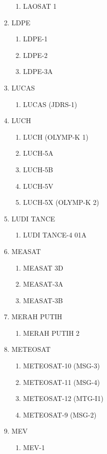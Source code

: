 \begin{multicols}{2}
\begin{enumerate}
\begin{enumerate}
    \item LAOSAT 1
  \end{enumerate}
  \item LDPE
  \begin{enumerate}
    \item LDPE-1
    \item LDPE-2
    \item LDPE-3A
  \end{enumerate}
  \item LUCAS
  \begin{enumerate}
    \item LUCAS (JDRS-1)
  \end{enumerate}
  \item LUCH
  \begin{enumerate}
    \item LUCH (OLYMP-K 1)
    \item LUCH-5A
    \item LUCH-5B
    \item LUCH-5V
    \item LUCH-5X (OLYMP-K 2)
  \end{enumerate}
  \item LUDI TANCE
  \begin{enumerate}
    \item LUDI TANCE-4 01A
  \end{enumerate}
  \item MEASAT
  \begin{enumerate}
    \item MEASAT 3D
    \item MEASAT-3A
    \item MEASAT-3B
  \end{enumerate}
  \item MERAH PUTIH
  \begin{enumerate}
    \item MERAH PUTIH 2
  \end{enumerate}
  \item METEOSAT
  \begin{enumerate}
    \item METEOSAT-10 (MSG-3)
    \item METEOSAT-11 (MSG-4)
    \item METEOSAT-12 (MTG-I1)
    \item METEOSAT-9 (MSG-2)
  \end{enumerate}
  \item MEV
  \begin{enumerate}
    \item MEV-1

\end{enumerate}
\end{enumerate}
\end{multicols}
